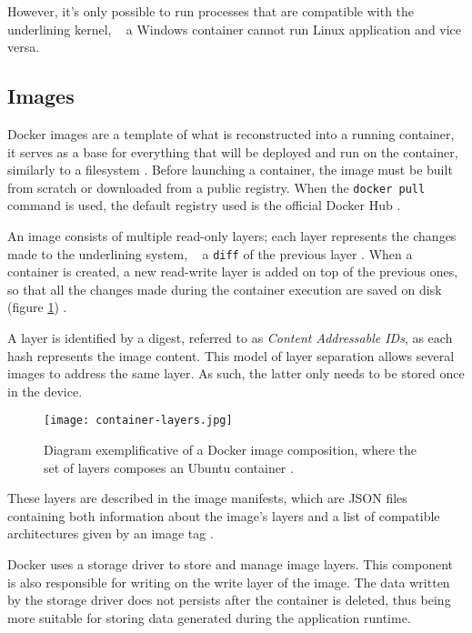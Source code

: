 However, it's only possible to run processes that are compatible with the underlining kernel, \ie~ a Windows container cannot run Linux application and vice versa.



\subsection{Images}
\label{sec::arch:images}
Docker images are a template of what is reconstructed into a running container, it serves as a base for everything that will be deployed and run on the container, similarly to a filesystem \cite{Kane2018-fn}. Before launching a container, the image must be built from scratch or downloaded from a public registry. When the \texttt{docker pull} command is used, the default registry used is the official Docker Hub \cite{docker-hub}.

An image consists of multiple read-only layers; each layer represents the changes made to the underlining system, \ie~ a \texttt{diff} of the previous layer \cite{images-layers}. When a container is created, a new read-write layer is added on top of the previous ones, so that all the changes made during the container execution are saved on disk (figure \ref{fig:docker-image}) \cite{fig-src:image-layers}.

A layer is identified by a digest, referred to as \textit{Content Addressable IDs}, as each hash represents the image content. This model of layer separation allows several images to address the same layer. As such, the latter only needs to be stored once in the device.

\begin{figure}[!htb]
    \centering
    \texttt{[image: container-layers.jpg]}
    \caption{Diagram exemplificative of a Docker image composition, where the set of layers composes an Ubuntu container \cite{fig-src:image-layers}.}
    \label{fig:docker-image}
\end{figure}

These layers are described in the image manifests, which are \acs{JSON} files containing both information about the image's layers and a list of compatible architectures given by an image tag \cite{image-manifest}.

Docker uses a storage driver to store and manage image layers. This component is also responsible for writing on the write layer of the image. The data written by the storage driver does not persists after the container is deleted, thus being more suitable for storing data generated during the application runtime\cite{storage-driver}.

